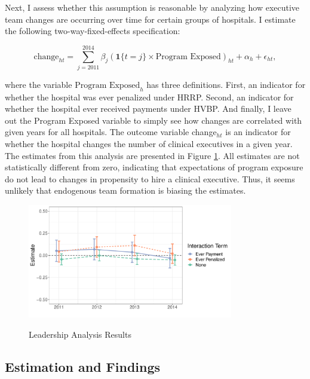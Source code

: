 \documentclass[12pt]{article}
\begin{document}
    Next, I assess whether this assumption is reasonable by analyzing how executive team changes are occurring over time for certain groups of hospitals. I estimate the following two-way-fixed-effects specification:

    \begin{equation}\label{eq:change2}
    \text{change}_{ht} = \sum_{j=2011}^{2014}\beta_j(\mathbf{1}\{t=j\}\times \text{Program Exposed})_{ht} + \alpha_h + \epsilon_{ht},
    \end{equation}

    where the variable $\text{Program Exposed}_{h}$ has three definitions. First, an indicator for whether the hospital was ever penalized under HRRP. Second, an indicator for whether the hospital ever received payments under HVBP. And finally, I leave out the Program Exposed variable to simply see how changes are correlated with given years for all hospitals. The outcome variable change$_{ht}$ is an indicator for whether the hospital changes the number of clinical executives in a given year. The estimates from this analysis are presented in Figure \ref{fig:change_analysis}. All estimates are not statistically different from zero, indicating that expectations of program exposure do not lead to changes in propensity to hire a clinical executive. Thus, it seems unlikely that endogenous team formation is biasing the estimates. 

     \begin{figure}[ht!]
         \centering
         \caption{Leadership Analysis Results}
         \includegraphics[width=0.8\textwidth]{Objects/change_analysis_plot.pdf}
         \label{fig:change_analysis}
     \end{figure}

     \subsection{Estimation and Findings}\label{sec:decomp}
\end{document}
